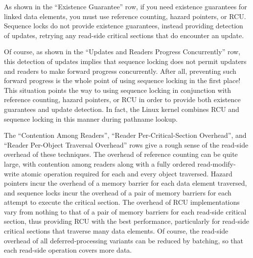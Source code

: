 As shown in the ``Existence Guarantee'' row,
if you need existence guarantees for linked
data elements, you must use reference counting, hazard pointers, or RCU\@.
Sequence locks do not provide existence guarantees, instead providing
detection of updates, retrying any read-side critical sections
that do encounter an update.

Of course, as shown in the ``Updates and Readers Progress Concurrently''
row, this detection of updates implies
that sequence locking does not permit updaters and readers to make forward
progress concurrently.
After all, preventing such forward progress is the whole point of using
sequence locking in the first place!
This situation points the way to using sequence locking in conjunction
with reference counting, hazard pointers, or RCU in order to provide
both existence guarantees and update detection.
In fact, the Linux kernel combines RCU and sequence locking in
this manner during pathname lookup.

The ``Contention Among Readers'', ``Reader Per-Critical-Section Overhead'',
and ``Reader Per-Object Traversal Overhead'' rows give a rough sense of
the read-side overhead of these techniques.
The overhead of reference counting can be quite large, with
contention among readers along with a fully ordered read-modify-write
atomic operation required for each and every object traversed.
Hazard pointers incur the overhead of a memory barrier for each data element
traversed, and sequence locks incur the overhead of a pair of memory barriers
for each attempt to execute the critical section.
The overhead of RCU implementations vary from nothing to that of a pair of
memory barriers for each read-side critical section, thus providing RCU
with the best performance, particularly for read-side critical sections
that traverse many data elements.
Of course, the read-side overhead of all deferred-processing variants can
be reduced by batching, so that each read-side operation covers more data.

\QuickQuizEnd

